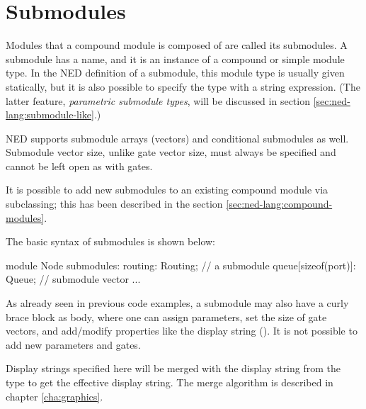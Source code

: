 \section{Submodules}
\label{sec:ned-lang:submodules}

Modules that a compound module is composed of are called its submodules.
A submodule has a name, and it is an instance of a compound or simple
module type. In the NED definition of a submodule, this module type
is usually given statically, but it is also possible to specify the type
with a string expression. (The latter feature, \textit{parametric submodule
types}, will be discussed in section \ref{sec:ned-lang:submodule-like}.)

NED supports submodule arrays (vectors) and conditional submodules as well.
Submodule vector size, unlike gate vector size, must always be specified
and cannot be left open as with gates.

It is possible to add new submodules to an existing compound module via
subclassing; this has been described in the section
\ref{sec:ned-lang:compound-modules}.

The basic syntax of submodules is shown below:

\begin{ned}
module Node
{
    submodules:
        routing: Routing;   // a submodule
        queue[sizeof(port)]: Queue;  // submodule vector
        ...
}
\end{ned}

As already seen in previous code examples, a submodule may also have a
curly brace block as body, where one can assign parameters, set the size of
gate vectors, and add/modify properties like the display string
(). It is not possible to add new parameters and gates.

Display strings specified here will be merged with the display string
from the type to get the effective display string. The merge algorithm is
described in chapter \ref{cha:graphics}.


